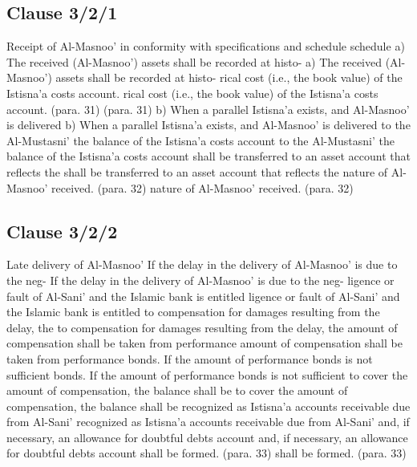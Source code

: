 \documentclass{article}%
\begin{document}
\subsection{Clause 3/2/1}%
\label{subsec:Clause3/2/1}%
Receipt of Al-Masnoo’ in conformity with specifications and  schedule schedule a) The received (Al-Masnoo’) assets shall be recorded at histo- a) The received (Al-Masnoo’) assets shall be recorded at histo- rical cost (i.e., the book value) of the Istisna’a costs account.  rical cost (i.e., the book value) of the Istisna’a costs account.  (para. 31) (para. 31) b) When a parallel Istisna’a exists, and Al-Masnoo’ is delivered  b) When a parallel Istisna’a exists, and Al-Masnoo’ is delivered  to the Al-Mustasni’ the balance of the Istisna’a costs account  to the Al-Mustasni’ the balance of the Istisna’a costs account  shall be transferred to an asset account that reflects the  shall be transferred to an asset account that reflects the  nature of Al-Masnoo’ received. (para. 32) nature of Al-Masnoo’ received. (para. 32)

%
\subsection{Clause 3/2/2}%
\label{subsec:Clause3/2/2}%
Late delivery of Al-Masnoo’   If the delay in the delivery of Al-Masnoo’ is due to the neg-   If the delay in the delivery of Al-Masnoo’ is due to the neg- ligence or fault of Al-Sani’ and the Islamic bank is entitled  ligence or fault of Al-Sani’ and the Islamic bank is entitled  to compensation for damages resulting from the delay, the  to compensation for damages resulting from the delay, the  amount of compensation shall be taken from performance  amount of compensation shall be taken from performance  bonds. If the amount of performance bonds is not sufficient  bonds. If the amount of performance bonds is not sufficient  to cover the amount of compensation, the balance shall be  to cover the amount of compensation, the balance shall be  recognized as Istisna’a accounts receivable due from Al-Sani’  recognized as Istisna’a accounts receivable due from Al-Sani’  and, if necessary, an allowance for doubtful debts account  and, if necessary, an allowance for doubtful debts account  shall be formed. (para. 33) shall be formed. (para. 33)

%
\end{document}
